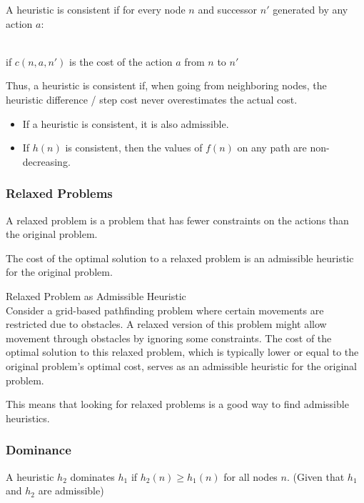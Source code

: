 \documentclass[
../../EiKI_Summary.tex,
]
{subfiles}
\begin{document}
\begin{defbox}
    A heuristic is consistent if for every node $n$ and successor $n'$ generated by any action $a$: 
    \begin{center}
        \\
        if $c(n, a, n')$ is the cost of the action $a$ from $n$ to $n'$
    \end{center}
    Thus, a heuristic is consistent if, when going from neighboring nodes, the heuristic difference / step cost never overestimates the actual cost.
\end{defbox}

\begin{defbox}
    [Lemmas]
    \begin{itemize}
        \item If a heuristic is consistent, it is also admissible.
        \item If $h(n)$ is consistent, then the values of $f(n)$ on any path are non-decreasing.
    \end{itemize}
\end{defbox}

\subsubsection{Relaxed Problems}
\begin{defbox*}
    A relaxed problem is a problem that has fewer constraints on the actions than the original problem.
\end{defbox*}

The cost of the optimal solution to a relaxed problem is an admissible heuristic for the original problem.

 Relaxed Problem as Admissible Heuristic\\
    Consider a grid-based pathfinding problem where certain movements are restricted due to obstacles. A relaxed version of this problem might allow movement through obstacles by ignoring some constraints. The cost of the optimal solution to this relaxed problem, which is typically lower or equal to the original problem's optimal cost, serves as an admissible heuristic for the original problem.

This means that looking for relaxed problems is a good way to find admissible heuristics.

\subsubsection{Dominance}
\begin{defbox*}
    A heuristic $h_2$ dominates $h_1$ if $h_2(n) \geq h_1(n)$ for all nodes $n$. (Given that $h_1$ and $h_2$ are admissible)
\end{defbox*}
\end{document}
